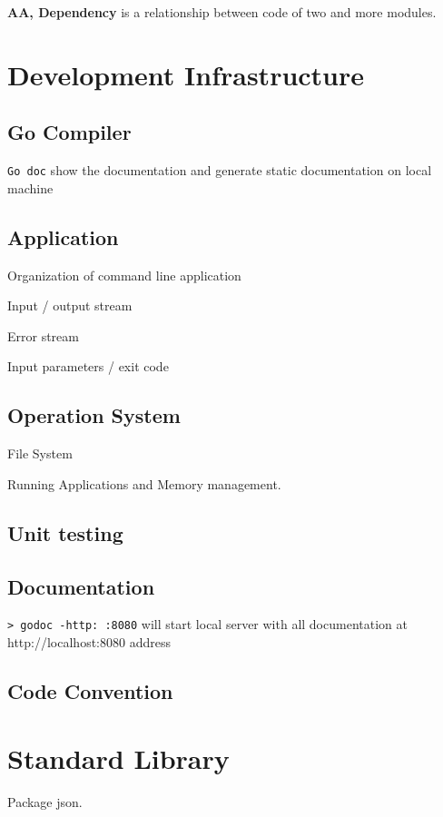 \documentclass[12pt]{article}
\begin{document}
\textbf{AA, Dependency} is a relationship between code of two and more modules.

\section{Development Infrastructure}
\label{sec:development-infrastructure}

\subsection{Go Compiler}

\texttt{Go doc} show the documentation and generate static documentation on
local machine

\subsection{Application}

Organization of command line application

Input / output stream

Error stream

Input parameters / exit code

\subsection{Operation System}

File System

Running Applications and Memory management.

\subsection{Unit testing}
\subsection{Documentation}

\texttt{> godoc -http: :8080} will start local server with all documentation at
http://localhost:8080 address

\subsection{Code Convention}

\section{Standard Library}

Package json.
\end{document}
